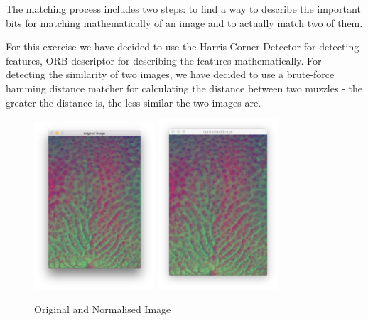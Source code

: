 The matching process includes two steps: to find a way to describe the important bits for matching mathematically of an image and to actually match two of them.

For this exercise we have decided to use the Harris Corner Detector for detecting features, ORB descriptor \cite{orb} for describing the features mathematically. For detecting the similarity of two images, we have decided to use a brute-force hamming distance matcher \cite{feature_matching} for calculating the distance between two muzzles - the greater the distance is, the less similar the two images are.

\begin{figure}[H]
  	\centering
    \includegraphics[width=0.4\textwidth]{images/algorithm/original.png}
    \includegraphics[width=0.4\textwidth]{images/algorithm/normalised.png}

  	\caption[Original and Normalised Image]{Original and Normalised Image}
  	\label{fig:original}
\end{figure}

